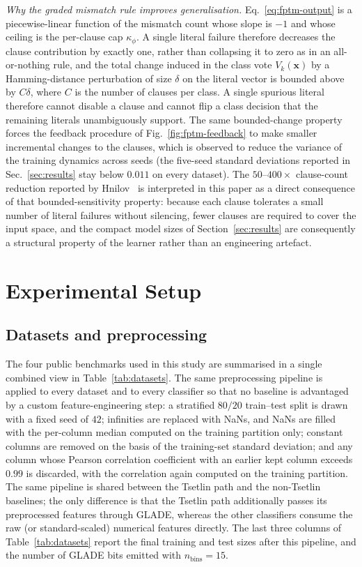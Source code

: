 \documentclass[journal,10pt]{IEEEtran}
\begin{document}
\emph{Why the graded mismatch rule improves generalisation.}
Eq.~\eqref{eq:fptm-output} is a piecewise-linear function of the
mismatch count whose slope is $-1$ and whose ceiling is the
per-clause cap $\kappa_\phi$. A single literal failure therefore
decreases the clause contribution by exactly one, rather than
collapsing it to zero as in an all-or-nothing rule, and the total
change induced in the class vote $V_k(\mathbf{x})$ by a Hamming-distance
perturbation of size $\delta$ on the literal vector is bounded
above by $C\delta$, where $C$ is the number of clauses per class.
A single spurious literal therefore cannot disable a clause and
cannot flip a class decision that the remaining literals
unambiguously support. The same bounded-change property forces the
feedback procedure of Fig.~\ref{fig:fptm-feedback} to make smaller
incremental changes to the clauses, which is observed to reduce
the variance of the training dynamics across seeds (the five-seed
standard deviations reported in Sec.~\ref{sec:results} stay below
$0.011$ on every dataset). The $50$--$400\times$ clause-count
reduction reported by Hnilov~\cite{hnilov2025fuzzy} is interpreted
in this paper as a direct consequence of that bounded-sensitivity
property: because each clause tolerates a small number of literal
failures without silencing, fewer clauses are required to cover
the input space, and the compact model sizes of
Section~\ref{sec:results} are consequently a structural property
of the learner rather than an engineering artefact.

\section{Experimental Setup}
\label{sec:setup}

\subsection{Datasets and preprocessing}
\label{sec:datasets}
The four public benchmarks used in this study are summarised in a
single combined view in Table~\ref{tab:datasets}. The same
preprocessing pipeline is applied to every dataset and to every
classifier so that no baseline is advantaged by a custom
feature-engineering step: a stratified $80/20$ train--test split is
drawn with a fixed seed of $42$; infinities are replaced with NaNs,
and NaNs are filled with the per-column median computed on the
training partition only; constant columns are removed on the basis
of the training-set standard deviation; and any column whose Pearson
correlation coefficient with an earlier kept column exceeds $0.99$
is discarded, with the correlation again computed on the training
partition. The same pipeline is shared between the Tsetlin path and
the non-Tsetlin baselines; the only difference is that the Tsetlin
path additionally passes its preprocessed features through GLADE,
whereas the other classifiers consume the raw (or standard-scaled)
numerical features directly. The last three columns of
Table~\ref{tab:datasets} report the final training and test sizes
after this pipeline, and the number of GLADE bits emitted with
$n_\text{bins}=15$.
\end{document}
